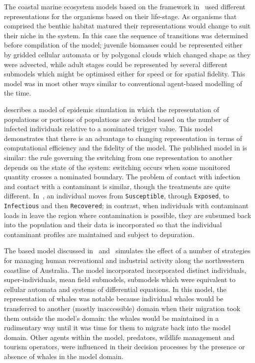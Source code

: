 The coastal marine ecosystem models based on the \InVitro framework
in~\cite{gray2006nws} used different representations for the organisms
based on their life-stage. As organisms that comprised the benthic
habitat matured their representations would change to suit their niche
in the system.  In this case the sequence of transitions was
determined before compilation of the model; juvenile biomasses could
be represented either by gridded cellular automata or by polygonal
clouds which changed shape as they were advected, while adult stages
could be represented by several different submodels which might be
optimised either for speed or for spatial fidelity.  This model was in
most other ways similar to conventional agent-based modelling of the
time.


\Cite{bobashev2007hybrid} describes a model of epidemic simulation in
which the representation of populations or portions of populations are
decided based on the number of infected individuals relative to a
nominated trigger value. This model demonstrates that there is an
advantage to changing representation in terms of computational
efficiency and the fidelity of the model. The published model in
\Ctwo is similar: the rule governing the
switching from one representation to another depends on the state of
the system: switching occurs when some monitored quantity crosses a
nominated boundary. The problem of contact with infection and contact
with a contaminant is similar, though the treatments are quite
different. In~\citet{bobashev2007hybrid}, an individual moves
from \texttt{Susceptible}, through \texttt{Exposed},
to \texttt{Infectious} and then \texttt{Recovered}; in contrast, when
individuals with contaminant loads in \Ctwo
leave the region where contamination is possible, they are subsumed
back into the population and their data is incorporated so that the
individual contaminant profiles are maintained and subject to
depuration.

The \InVitro based model discussed in~\cite{gray2014}
and~\cite{fulton2009crossingscales} simulates the effect of a number
of strategies for managing human recreational and industrial activity
along the northwestern coastline of Australia. The model incorporated
incorporated distinct individuals, super-individuals, mean field
submodels, submodels which were equivalent to cellular automata and
systems of differential equations. In this model, the representation
of whales was notable because individual whales would be transferred
to another (mostly inaccessible) domain when their migration took them
outside the model's domain: the whales would be maintained in a
rudimentary way until it was time for them to migrate back into the
model domain. Other agents within the model, predators, wildlife
management and tourism operators, were influenced in their decision
processes by the presence or absence of whales in the model domain.

